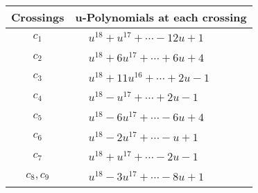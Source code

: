 \documentclass[1p]{elsarticle_modified}
\theoremstyle{definition}
\begin{document}
\begin{tabular}{m{50pt}|m{274pt}}
Crossings & \hspace{64pt}u-Polynomials at each crossing \\
\hline $$\begin{aligned}c_{1}\end{aligned}$$&$\begin{aligned}
&u^{18}+u^{17}+\cdots-12 u+1
\end{aligned}$\\
\hline $$\begin{aligned}c_{2}\end{aligned}$$&$\begin{aligned}
&u^{18}+6 u^{17}+\cdots+6 u+4
\end{aligned}$\\
\hline $$\begin{aligned}c_{3}\end{aligned}$$&$\begin{aligned}
&u^{18}+11 u^{16}+\cdots+2 u-1
\end{aligned}$\\
\hline $$\begin{aligned}c_{4}\end{aligned}$$&$\begin{aligned}
&u^{18}- u^{17}+\cdots+2 u-1
\end{aligned}$\\
\hline $$\begin{aligned}c_{5}\end{aligned}$$&$\begin{aligned}
&u^{18}-6 u^{17}+\cdots-6 u+4
\end{aligned}$\\
\hline $$\begin{aligned}c_{6}\end{aligned}$$&$\begin{aligned}
&u^{18}-2 u^{17}+\cdots- u+1
\end{aligned}$\\
\hline $$\begin{aligned}c_{7}\end{aligned}$$&$\begin{aligned}
&u^{18}+u^{17}+\cdots-2 u-1
\end{aligned}$\\
\hline $$\begin{aligned}c_{8},c_{9}\end{aligned}$$&$\begin{aligned}
&u^{18}-3 u^{17}+\cdots-8 u+1
\end{aligned}$\\

\end{tabular}
\end{document}
